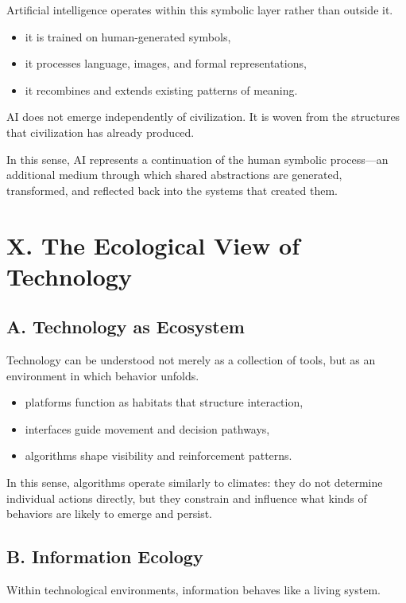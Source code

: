 \documentclass[12pt]{article}
\begin{document}
Artificial intelligence operates within this symbolic layer rather than outside it.

\begin{itemize}
    \item it is trained on human-generated symbols,
    \item it processes language, images, and formal representations,
    \item it recombines and extends existing patterns of meaning.
\end{itemize}

AI does not emerge independently of civilization. It is woven from the structures that civilization has already produced.

In this sense, AI represents a continuation of the human symbolic process—an additional medium through which shared abstractions are generated, transformed, and reflected back into the systems that created them.

\section*{X. The Ecological View of Technology}

\subsection*{A. Technology as Ecosystem}

Technology can be understood not merely as a collection of tools, but as an environment in which behavior unfolds.

\begin{itemize}
    \item platforms function as habitats that structure interaction,
    \item interfaces guide movement and decision pathways,
    \item algorithms shape visibility and reinforcement patterns.
\end{itemize}

In this sense, algorithms operate similarly to climates: they do not determine individual actions directly, but they constrain and influence what kinds of behaviors are likely to emerge and persist.

\subsection*{B. Information Ecology}

Within technological environments, information behaves like a living system.
\end{document}
